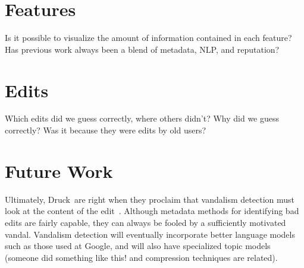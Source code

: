     \section{Features}
        Is it possible to visualize the amount of information
        contained in each feature?
        Has previous work always been a blend of metadata, NLP,
        and reputation?
    \section{Edits}
        Which edits did we guess correctly, where others didn't?
        Why did we guess correctly?  Was it because they were edits
        by old users?

    \section{Future Work}
        Ultimately, Druck~\etal are right when they proclaim that
        vandalism detection must look at the content of the
        edit~\cite{Druck2008}.
        Although metadata methods for identifying bad edits are
        fairly capable, they can always be fooled by a sufficiently
        motivated vandal.
        Vandalism detection will eventually incorporate better
        language models such as those used at Google,
        and will also have specialized topic models (someone did
        something like this!  and compression techniques are
        related).


